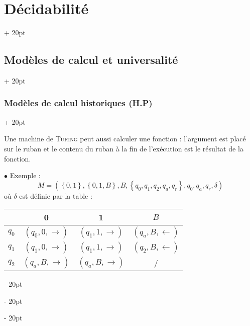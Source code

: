 \documentclass[a4paper, 12pt, twoside]{article}
\newcommand{\lr}[1]{\left( #1 \right)}
\newcommand{\set}[1]{\left\{ #1 \right\}}
\newcommand{\ind}[1][20pt]{\advance\leftskip + #1}
\newcommand{\deind}[1][20pt]{\advance\leftskip - #1}
\newenvironment{indt}[2][20pt]{#2 \par \ind[#1]}{\par \deind} %
\begin{document}
\begin{indt}{\section{Décidabilité}}
\begin{indt}{\subsection{Modèles de calcul et universalité}}
\begin{indt}{\subsubsection{Modèles de calcul historiques (H.P)}}
                \vspace{6pt}
                
                Une machine de \textsc{Turing} peut aussi calculer une fonction : l'argument est placé sur le ruban et le contenu du ruban à la fin de l'exécution est le résultat de la fonction.

                \vspace{12pt}
                
                $\bullet$ Exemple :
                \[
                    M = \lr{\set{0, 1}, \set{0, 1, B}, B, \set{q_0, q_1, q_2, q_a, q_r}, q_0, q_a, q_r, \delta}
                \]
                où $\delta$ est définie par la table :
                \begin{center}
                    \begin{tabular}{c|ccc}
                        & 0 & 1 & $B$
                        \\
                        \hline
                        $q_0$ & $(q_0, 0, \rightarrow)$ & $(q_1, 1, \rightarrow)$ & $(q_a, B, \leftarrow)$
                        \\
                        $q_1$ & $(q_1, 0, \rightarrow)$ & $(q_1, 1, \rightarrow)$ & $(q_2, B, \leftarrow)$
                        \\
                        $q_2$ & $(q_a, B, \rightarrow)$ & $(q_a, B, \rightarrow)$ & /
                    \end{tabular}
                \end{center}


\end{indt}
\end{indt}
\end{indt}
\end{document}
